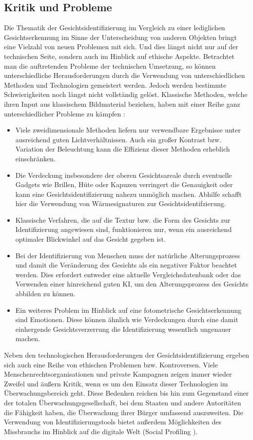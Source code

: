 \documentclass[doktyp=semarbeit, sprache=german]{TUBAFarbeiten}
\begin{document}
\subsection{Kritik und Probleme}
Die Thematik der Gesichtsidentifizierung im Vergleich zu einer lediglichen Gesichtserkennung im Sinne der Unterscheidung von anderen Objekten bringt eine Vielzahl von neuen Problemen mit sich. Und dies längst nicht nur auf der technischen Seite, sondern auch im Hinblick auf ethische Aspekte.
Betrachtet man die auftretenden Probleme der technischen Umsetzung, so können unterschiedliche Herausforderungen durch die Verwendung von unterschiedlichen Methoden und Technologien gemeistert werden. Jedoch werden bestimmte Schwierigkeiten noch längst nicht vollständig gelöst. Klassische Methoden, welche ihren Input aus klassischem Bildmaterial beziehen, haben mit einer Reihe ganz unterschiedlicher Probleme zu kämpfen \cite{MainBook}:
\begin{itemize}
\item Viele zweidimensionale Methoden liefern nur verwendbare Ergebnisse unter ausreichend guten Lichtverhältnissen. Auch ein großer Kontrast bzw. Variation der Beleuchtung kann die Effizienz dieser Methoden erheblich einschränken.
\item Die Verdeckung insbesondere der oberen Gesichtsareale durch eventuelle Gadgets wie Brillen, Hüte oder Kapuzen verringert die Genauigkeit oder kann eine Gesichtsidentifizierung nahezu unmöglich machen. Abhilfe schafft hier die Verwendung von Wärmesignaturen zur Gesichtsidentifzierung.
\item Klassische Verfahren, die auf die Textur bzw. die Form des Gesichts zur Identifizierung angewiesen sind, funktionieren nur, wenn ein ausreichend optimaler Blickwinkel auf das Gesicht gegeben ist.
\item Bei der Identifizierung von Menschen muss der natürliche Alterungsprozess und damit die Veränderung des Gesichts als ein negativer Faktor beachtet werden. Dies erfordert entweder eine aktuelle Vergleichsdatenbank oder das Verwenden einer hinreichend guten KI, um den Alterungsprozess des Gesichts abbilden zu können.
\item Ein weiteres Problem im Hinblick auf eine fotometrische Gesichtserkennung sind Emotionen. Diese können ähnlich wie Verdeckungen durch eine damit einhergende Gesichtsverzerrung die Identifizierung wesentlich ungenauer machen.
\end{itemize}
Neben den technologischen Herausforderungen der Gesichtsidentifizierung ergeben sich auch eine Reihe von ethischen Problemen bzw. Kontroversen. Viele Menschenrechtsorganisationen und private Kampagnen zeigen immer wieder Zweifel und äußern Kritik, wenn es um den Einsatz dieser Technologien im Überwachungsbereich geht. Diese Bedenken reichen bis hin zum Gegenstand einer der \glqq totalen Überwachungsgesellschaft\grqq{}, bei dem Staaten und andere Autoritäten die Fähigkeit haben, die Überwachung ihrer Bürger umfassend auszuweiten. Die Verwendung von Identifizierungstools bietet außerdem Möglichkeiten des Missbrauchs im Hinblick auf die digitale Welt (Social Profiling \cite{SocialProfiling}).
\end{document}
